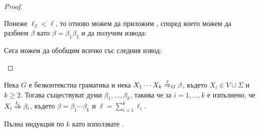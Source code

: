 \begin{proof}
\begin{itemize}
\begin{prooftree}
  \end{prooftree}
  Понеже $\ell_2 < \ell$, то отново можем да приложим \IndHyp, според което можем да разбием $\beta$ като $\beta = \beta_1\beta_2$ и да получим извода:
  \begin{prooftree}
  \end{prooftree}
  Сега можем да обобщим всичко със следния извод:
  \begin{prooftree}
  \end{prooftree}
\end{itemize}
\end{proof}

\begin{proposition}\label{pr:grammar:divide}
  Нека $G$ е безконтекстна граматика и нека $X_1\cdots X_k \derive{\ell}_G \beta$, където $X_i \in V \cup \Sigma$ и $k \geq 2$.
  Тогава съществуват думи $\beta_1,\dots,\beta_k$, такива че за $i = 1,\dots, k$ е изпълнено, че
  $X_i \derive{\ell_i} \beta_i$, където $\beta = \beta_1\cdots \beta_k$ и $\ell = \sum^k_{i = 1}\ell_i$.
\end{proposition}
\begin{hint}
  Пълна индукция по $k$ като използвате .
\end{hint}
  
